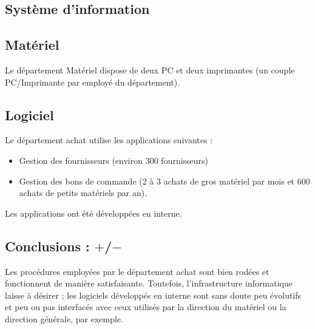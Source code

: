 \subsection{Système d'information}

\subsection{Matériel}
Le département Matériel dispose de deux PC et deux imprimantes (un couple
PC/Imprimante par employé du département).

\subsection{Logiciel}
Le département achat utilise les applications suivantes :
\begin{itemize}
\item Gestion des fournisseurs (environ 300 fournisseurs)
\item Gestion des bons de commande (2 à 3 achats de gros matériel par mois
        et 600 achats de petits matériels par an).
\end{itemize}

Les applications ont été développées en interne.


\subsection{Conclusions : $+$/$-$}

Les procédures employées par le département achat sont bien rodées et
fonctionnent de manière satisfaisante. Toutefois, l'infrastructure
informatique laisse à désirer ; les logiciels développés en interne sont
sans doute peu évolutifs et peu ou pas interfacés avec ceux utilisés par la
direction du matériel ou la direction générale, par exemple.

